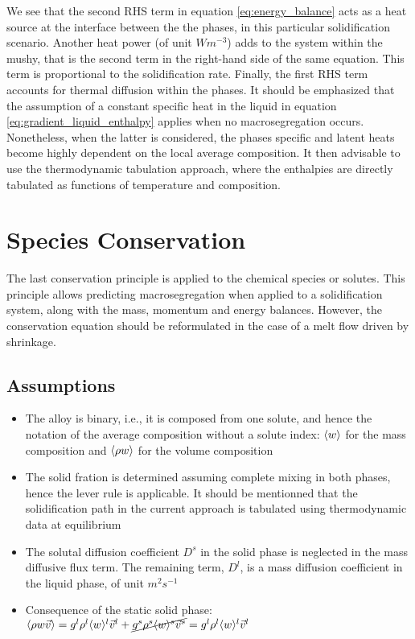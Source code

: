 We see that the second RHS term in equation \eqref{eq:energy_balance} acts as 
a heat source at the interface between the the phases, in this particular solidification
scenario. Another heat power (of unit $Wm^{-3}$) adds to the system within the mushy, 
that is the second term in the right-hand side of the same equation. This term is 
proportional to the solidification rate. Finally, the first RHS term accounts for thermal 
diffusion within the phases.
\newline
It should be emphasized that the assumption of a constant specific heat in the liquid in 
equation \eqref{eq:gradient_liquid_enthalpy} applies when no macrosegregation occurs. 
Nonetheless, when the latter is considered, the phases specific and latent heats become 
highly dependent on the local average composition. It then advisable to use the thermodynamic 
tabulation approach, where the enthalpies are directly tabulated as functions of temperature 
and composition. 
\section{Species Conservation}
The last conservation principle is applied to the chemical species or solutes. This principle allows predicting
macrosegregation when applied to a solidification system, along with the mass, momentum and energy balances.
However, the conservation equation should be reformulated in the case of a melt flow driven by shrinkage.
\subsection{Assumptions}
\begin{itemize}
\item The alloy is binary, i.e., it is composed from one solute, and hence the notation of the average composition
		without a solute index: $\langle w \rangle$ for the mass composition and $\langle \rho w \rangle$ for the volume composition
\item The solid fration is determined assuming complete mixing in both phases, hence the lever rule is applicable. It
		should be mentionned that the solidification path in the current approach is tabulated using thermodynamic data at 
		equilibrium
\item The solutal diffusion coefficient $D^s$ in the solid phase is neglected in the mass diffusive flux term. The
		remaining term, $D^l$, is a mass diffusion coefficient in the liquid phase, of unit $m^2 s^{-1}$
\item Consequence of the static solid phase: $\langle \rho w \vec{v} \rangle = {g^l} \rho^l \langle w \rangle^l \vec{v}^l +  \cancel{{g^s} \rho^s \langle w \rangle^s \vec{v}^s} = {g^l} \rho^l \langle w \rangle^l \vec{v}^l$ 
\end{itemize}
